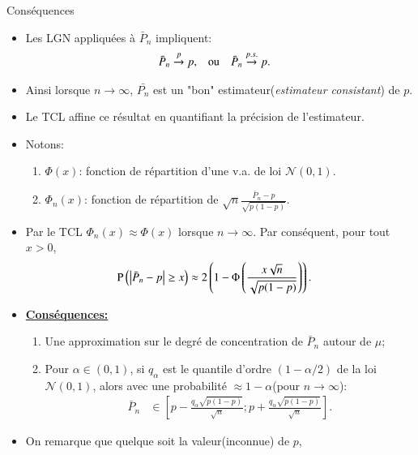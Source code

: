 \begin{frame}[allowframebreaks]{Conséquences}
    \begin{itemize}
        \item  Les LGN appliquées à $\bar{P}_n$ impliquent:
    \begin{align*}
        \bar{P}_n \overset{p}{\rightarrow} p, &\quad \textrm{ou} \quad  \bar{P}_n \overset{p.s.}{\rightarrow} p.
    \end{align*}
    \item Ainsi lorsque $n\rightarrow \infty$, $\bar{P_n}$ est un "bon" 
    estimateur(\emph{estimateur consistant}) de $p$.
        \item Le TCL affine ce résultat en quantifiant la précision de l'estimateur.
        \framebreak
        \item Notons: 
        \begin{enumerate}[-]
            \item $\Phi(x)$: fonction de répartition d'une v.a. de loi $\mathcal{N}(0, 1)$.
            \item $\Phi_n(x)$: fonction de répartition de $\sqrt{n}\frac{\bar{P}_n-p}{\sqrt{p(1-p)}}$.
        \end{enumerate}
        \item Par le TCL $\Phi_n(x)\approx \Phi(x)$ lorsque $n\rightarrow \infty$. Par conséquent, 
        pour tout $x> 0$,
        \begin{align*}
            \operatorname{P}\left(\left\vert {\bar{P}_n- p} \right\vert\geq x\right)
            &\approx 2\left(1-\Phi\left(\frac{x\sqrt{n}}{\sqrt{p(1-p)}}\right)\right).
        \end{align*}
        \framebreak
        \item \textbf{\underline{Conséquences:}}
        \begin{enumerate}[-]
            \item Une approximation sur le degré de concentration de $\bar{P}_n$ autour de $\mu$;
            \item Pour $\alpha \in(0, 1)$, si $q_\alpha$ est le quantile d'ordre $(1-\alpha/2)$ 
            de la loi $\mathcal{N}(0, 1)$, alors avec une probabilité $\approx 1-\alpha$(pour $n\rightarrow \infty$): 
            \begin{align*}
                \bar{P}_n&\in\left[p - \frac{q_\alpha\sqrt{p(1-p)}}{\sqrt{n}};
                p + \frac{q_\alpha\sqrt{p(1-p)}}{\sqrt{n}}\right].
            \end{align*}
        \end{enumerate}
        \framebreak
        \item On remarque que quelque soit la valeur(inconnue) de $p$,\begin{align*}

\end{align*}
\end{itemize}
\end{frame}
